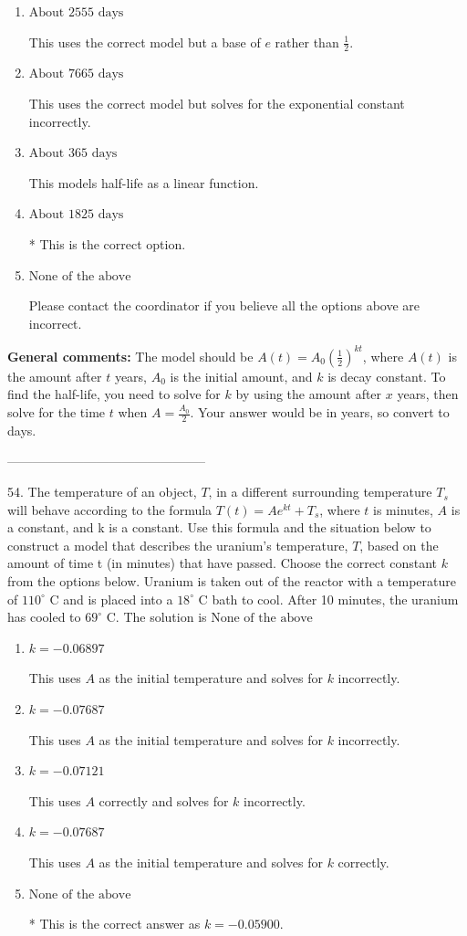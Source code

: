 \documentclass{extbook}[14pt]
\begin{document}
\begin{enumerate}[label=\Alph*.] 
\item $ \text{About } 2555 \text{ days} $ 

 This uses the correct model but a base of $e$ rather than $\frac{1}{2}$. 
\item $ \text{About } 7665 \text{ days} $ 

 This uses the correct model but solves for the exponential constant incorrectly. 
\item $ \text{About } 365 \text{ days} $ 

 This models half-life as a linear function. 
\item $ \text{About } 1825 \text{ days} $ 

 * This is the correct option. 
\item $ \text{None of the above} $ 

 Please contact the coordinator if you believe all the options above are incorrect. 
\end{enumerate} 
 
\textbf{General comments:} The model should be $A(t) = A_0 (\frac{1}{2})^{kt}$, where $A(t)$ is the amount after $t$ years, $A_0$ is the initial amount, and $k$ is decay constant. To find the half-life, you need to solve for $k$ by using the amount after $x$ years, then solve for the time $t$ when $A = \frac{A_0}{2}$. Your answer would be in years, so convert to days.

-----------------------------------------------

54. The temperature of an object, $T$, in a different surrounding temperature $T_s$ will behave according to the formula $T(t) = Ae^{kt} + T_s$, where $t$ is minutes, $A$ is a constant, and k is a constant. Use this formula and the situation below to construct a model that describes the uranium's temperature, $T$, based on the amount of time t (in minutes) that have passed. Choose the correct constant $k$ from the options below.
Uranium is taken out of the reactor with a temperature of $110^{\circ}$ C and is placed into a $18^{\circ}$ C bath to cool. After 10 minutes, the uranium has cooled to $69^{\circ}$ C. 
The solution is $ \text{None of the above} $ 

\begin{enumerate}[label=\Alph*.] 
\item $ k = -0.06897 $ 

 This uses $A$ as the initial temperature and solves for $k$ incorrectly. 
\item $ k = -0.07687 $ 

 This uses $A$ as the initial temperature and solves for $k$ incorrectly. 
\item $ k = -0.07121 $ 

 This uses $A$ correctly and solves for $k$ incorrectly. 
\item $ k = -0.07687 $ 

 This uses $A$ as the initial temperature and solves for $k$ correctly. 
\item $ \text{None of the above} $ 

 * This is the correct answer as $k = -0.05900$. 
\end{enumerate} 
 
\end{document}
